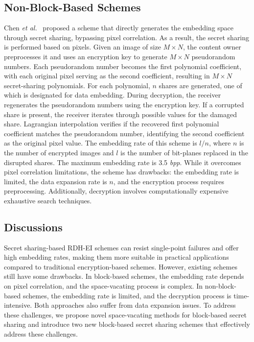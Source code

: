 \subsection{Non-Block-Based Schemes}
Chen \textit{et al.}~\cite{chen_secret_2020} proposed a scheme that directly generates the embedding space through secret sharing, bypassing pixel correlation. As a result, the secret sharing is performed based on pixels. Given an image of size $M \times N$, the content owner preprocesses it and uses an encryption key to generate $M \times N$ pseudorandom numbers. Each pseudorandom number becomes the first polynomial coefficient, with each original pixel serving as the second coefficient, resulting in $M \times N$ secret-sharing polynomials. For each polynomial, $n$ shares are generated, one of which is designated for data embedding. During decryption, the receiver regenerates the pseudorandom numbers using the encryption key. If a corrupted share is present, the receiver iterates through possible values for the damaged share. Lagrangian interpolation verifies if the recovered first polynomial coefficient matches the pseudorandom number, identifying the second coefficient as the original pixel value. The embedding rate of this scheme is $l/n$, where $n$ is the number of encrypted images and $l$ is the number of bit-planes replaced in the disrupted shares. The maximum embedding rate is 3.5 \textit{bpp}. While it overcomes pixel correlation limitations, the scheme has drawbacks: the embedding rate is limited, the data expansion rate is $n$, and the encryption process requires preprocessing. Additionally, decryption involves computationally expensive exhaustive search techniques.

\subsection{Discussions}
Secret sharing-based RDH-EI schemes can resist single-point failures and offer high embedding rates, making them more suitable in practical applications compared to traditional encryption-based schemes. However, existing schemes still have some drawbacks. In block-based schemes, the embedding rate depends on pixel correlation, and the space-vacating process is complex. In non-block-based schemes, the embedding rate is limited, and the decryption process is time-intensive. Both approaches also suffer from data expansion issues. To address these challenges, we propose novel space-vacating methods for block-based secret sharing and introduce two new block-based secret sharing schemes that effectively address these challenges.
